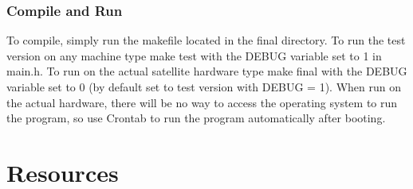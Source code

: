 \documentclass[10pt,letterpaper,onecolumn,draftclsnofoot,journal]{IEEEtran}
\begin{document}
\subsubsection{\textbf{Compile and Run}}
To compile, simply run the makefile located in the final directory. To run the test version on any machine type make test with the DEBUG variable set to 1 in main.h. To run on the actual satellite hardware type make final with the DEBUG variable set to 0 (by default set to test version with DEBUG = 1). When run on the actual hardware, there will be no way to access the operating system to run the program, so use Crontab to run the program automatically after booting.


\section{\textbf{Resources}}
\end{document}
